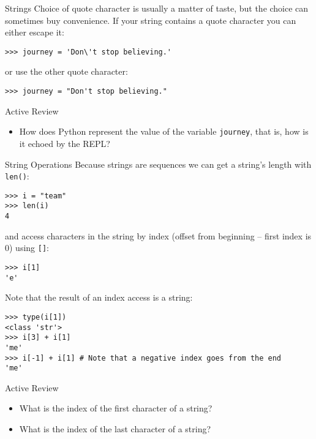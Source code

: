 \documentclass[smaller, aspectratio=1610]{beamer}
\begin{document}
\begin{frame}[label={sec:org4dd8b3a},fragile]{Strings}
 Choice of quote character is usually a matter of taste, but the choice can sometimes buy convenience. If your string contains a quote character you can either escape it:

\lstset{language=Python,label= ,caption= ,captionpos=b,numbers=none}
\begin{lstlisting}
>>> journey = 'Don\'t stop believing.'
\end{lstlisting}

or use the other quote character:

\lstset{language=Python,label= ,caption= ,captionpos=b,numbers=none}
\begin{lstlisting}
>>> journey = "Don't stop believing."
\end{lstlisting}

\begin{block}{Active Review}
\begin{itemize}
\item How does Python represent the value of the variable \texttt{journey}, that is, how is it echoed by the REPL?
\end{itemize}
\end{block}
\end{frame}

\begin{frame}[label={sec:org55b951b},fragile]{String Operations}
 Because strings are sequences we can get a string's length with \texttt{len()}:

\lstset{language=Python,label= ,caption= ,captionpos=b,numbers=none}
\begin{lstlisting}
>>> i = "team"
>>> len(i)
4
\end{lstlisting}

and access characters in the string by index (offset from beginning – first index is 0) using \texttt{[]}:

\lstset{language=Python,label= ,caption= ,captionpos=b,numbers=none}
\begin{lstlisting}
>>> i[1]
'e'
\end{lstlisting}

Note that the result of an index access is a string:

\lstset{language=Python,label= ,caption= ,captionpos=b,numbers=none}
\begin{lstlisting}
>>> type(i[1])
<class 'str'>
>>> i[3] + i[1]
'me'
>>> i[-1] + i[1] # Note that a negative index goes from the end
'me'
\end{lstlisting}

\begin{block}{Active Review}
\begin{itemize}
\item What is the index of the first character of a string?
\item What is the index of the last character of a string?
\end{itemize}
\end{block}
\end{frame}
\end{document}
